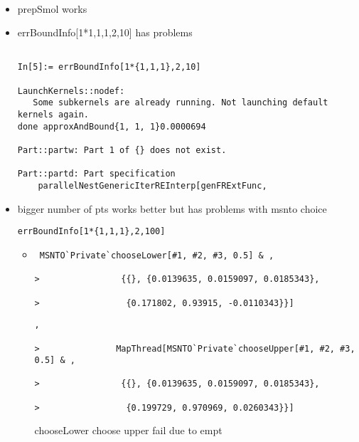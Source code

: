 \documentclass[hyperref,idxtotoc]{labbook}
\begin{document}
\begin{description}[style=nextline] 
\item[finishPaper.mth] \ 
  \begin{itemize}
  \item prepSmol works
  \item errBoundInfo[1*{1,1,1},2,10]  has problems
\begin{verbatim}

In[5]:= errBoundInfo[1*{1,1,1},2,10]

LaunchKernels::nodef: 
   Some subkernels are already running. Not launching default kernels again.
done approxAndBound{1, 1, 1}0.0000694

Part::partw: Part 1 of {} does not exist.

Part::partd: Part specification 
    parallelNestGenericIterREInterp[genFRExtFunc, 
\end{verbatim}
  \item bigger number of pts works better but has problems with msnto choice
\begin{verbatim}
errBoundInfo[1*{1,1,1},2,100]
\end{verbatim}
    \begin{itemize}
    \item
\begin{verbatim}
 MSNTO`Private`chooseLower[#1, #2, #3, 0.5] & , 
 
>                {{}, {0.0139635, 0.0159097, 0.0185343}, 
 
>                 {0.171802, 0.93915, -0.0110343}}]
\end{verbatim}
\begin{verbatim}
, 
 
>               MapThread[MSNTO`Private`chooseUpper[#1, #2, #3, 0.5] & , 
 
>                {{}, {0.0139635, 0.0159097, 0.0185343}, 
 
>                 {0.199729, 0.970969, 0.0260343}}]
\end{verbatim}
      chooseLower choose upper fail due to empt
    \end{itemize}
  \end{itemize}
\end{description}
\end{document}
